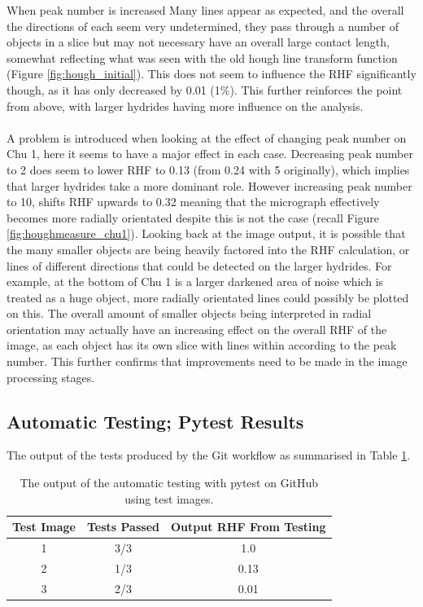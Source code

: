 \documentclass{article}
\begin{document}
    When peak number is increased Many lines appear as expected, and the overall the directions of each seem very undetermined, they pass through a number of objects in a slice but may not necessary have an overall large contact length, somewhat reflecting what was seen with the old hough line transform function (Figure \ref{fig:hough_initial}). This does not seem to influence the RHF significantly though, as it has only decreased by 0.01 (1\%). This further reinforces the point from above, with larger hydrides having more influence on the analysis.
    \\
    \\
    A problem is introduced when looking at the effect of changing peak number on Chu 1, here it seems to have a major effect in each case. Decreasing peak number to 2 does seem to lower RHF to 0.13 (from 0.24 with 5 originally), which implies that larger hydrides take a more dominant role. However increasing peak number to 10, shifts RHF upwards to 0.32 meaning that the micrograph effectively becomes more radially orientated despite this is not the case (recall Figure \ref{fig:houghmeasure_chu1}). Looking back at the image output, it is possible that the many smaller objects are being heavily factored into the RHF calculation, or lines of different directions that could be detected on the larger hydrides. For example, at the bottom of Chu 1 is a larger darkened area of noise which is treated as a huge object, more radially orientated lines could possibly be plotted on this. The overall amount of smaller objects being interpreted in radial orientation may actually have an increasing effect on the overall RHF of the image, as each object has its own slice with lines within according to the peak number. This further confirms that improvements need to be made in the image processing stages. 
    
\subsection{Automatic Testing; Pytest Results}
    The output of the tests produced by the Git workflow as summarised in Table \ref{TestResults}.

    \begin{table}[h]
        \centering
        \begin{tabular}{|c|c|c|}
        \hline
            \textbf{Test Image} & \textbf{Tests Passed} & \textbf{Output RHF From Testing}  \\
            \hline
            1 & 3/3 & 1.0 \\
            \hline
            2 & 1/3 & 0.13 \\
            \hline
            3 & 2/3 & 0.01 \\
            \hline
        \end{tabular}
        \caption{The output of the automatic testing with pytest on GitHub using test images.}
        \label{TestResults}
    \end{table}
\end{document}
